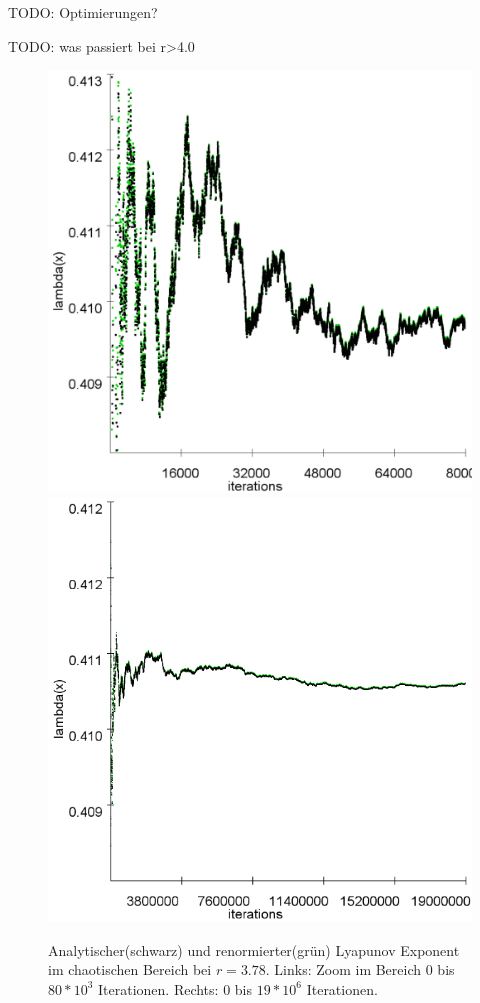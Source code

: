 \documentclass{scrartcl}
\begin{document}
TODO: Optimierungen?

TODO: was passiert bei r>4.0

\begin{figure}
\centering
\includegraphics[scale=0.18]{lya378-zoom}
\includegraphics[scale=0.36]{lya378}
\caption{Analytischer(schwarz) und renormierter(grün) Lyapunov Exponent im chaotischen Bereich bei $r=3.78$. Links: Zoom im Bereich 0 bis $80*10^3$ Iterationen. Rechts:  0 bis $19*10^6$ Iterationen.}
\label{fig:lyapunov-chaos}
\end{figure}
\end{document}
